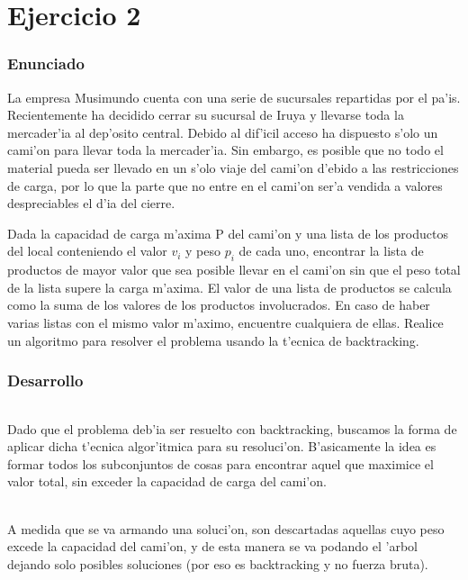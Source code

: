 \part{Ejercicio 2}
\section{Enunciado}
La empresa Musimundo cuenta con una serie de sucursales repartidas por el pa'is. Recientemente ha decidido cerrar su sucursal
de Iruya y llevarse toda la mercader'ia al dep'osito central. Debido al dif'icil acceso ha dispuesto s'olo un cami'on para
llevar toda la mercader'ia. Sin embargo, es posible que no todo el material pueda ser llevado en un s'olo viaje del cami'on
d'ebido a las restricciones de carga, por lo que la parte que no entre en el cami'on ser'a vendida a valores despreciables el
 d'ia del cierre.

Dada la capacidad de carga m'axima P del cami'on y una lista de los productos del local conteniendo el valor $v_i$ y peso $p_i$ 
de cada uno, encontrar la lista de productos de mayor valor que sea posible llevar en el cami'on sin que el peso total de la
lista supere la carga m'axima. El valor de una lista de productos se calcula como la suma de los valores de los productos
involucrados. En caso de haber varias listas con el mismo valor m'aximo, encuentre cualquiera de ellas.
Realice un algoritmo para resolver el problema usando la t'ecnica de backtracking.

\section{Desarrollo}
\paragraph{}
Dado que el problema deb'ia ser resuelto con backtracking, buscamos la forma de aplicar dicha t'ecnica 
algor'itmica para su resoluci'on. B'asicamente la idea es formar todos los subconjuntos de cosas para 
encontrar aquel que maximice el valor total, sin exceder la capacidad de carga del cami'on.

\paragraph{}
A medida que se va armando una soluci'on, son descartadas aquellas cuyo peso excede la capacidad del 
cami'on, y de esta manera se va podando el 'arbol dejando solo posibles soluciones (por eso es 
backtracking y no fuerza bruta).

